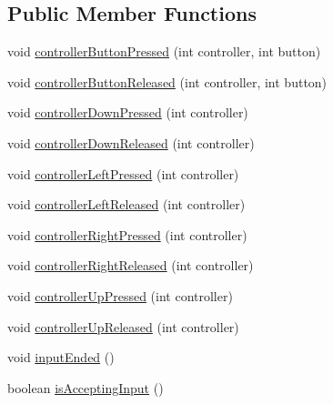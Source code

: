 \subsection*{Public Member Functions}
\begin{DoxyCompactItemize}
\item 
void \mbox{\hyperlink{classorg_1_1newdawn_1_1slick_1_1util_1_1_input_adapter_ad51a716fce13f062b7bef542c2d7641a}{controller\+Button\+Pressed}} (int controller, int button)
\item 
void \mbox{\hyperlink{classorg_1_1newdawn_1_1slick_1_1util_1_1_input_adapter_ab67126cbafdf4803d88270e945553019}{controller\+Button\+Released}} (int controller, int button)
\item 
void \mbox{\hyperlink{classorg_1_1newdawn_1_1slick_1_1util_1_1_input_adapter_af48b82447762dff2bc4b171d51468f1a}{controller\+Down\+Pressed}} (int controller)
\item 
void \mbox{\hyperlink{classorg_1_1newdawn_1_1slick_1_1util_1_1_input_adapter_a6cb307438dc81cba0ec7a9f6b4dbc887}{controller\+Down\+Released}} (int controller)
\item 
void \mbox{\hyperlink{classorg_1_1newdawn_1_1slick_1_1util_1_1_input_adapter_ad588e2783005ae0ff252efbc282688cb}{controller\+Left\+Pressed}} (int controller)
\item 
void \mbox{\hyperlink{classorg_1_1newdawn_1_1slick_1_1util_1_1_input_adapter_af1419aca62539a39f52be90f64e778e3}{controller\+Left\+Released}} (int controller)
\item 
void \mbox{\hyperlink{classorg_1_1newdawn_1_1slick_1_1util_1_1_input_adapter_a558dd87511a7ab61be9d895476e91444}{controller\+Right\+Pressed}} (int controller)
\item 
void \mbox{\hyperlink{classorg_1_1newdawn_1_1slick_1_1util_1_1_input_adapter_ae2c91a34637c5d9af99d2098878b367e}{controller\+Right\+Released}} (int controller)
\item 
void \mbox{\hyperlink{classorg_1_1newdawn_1_1slick_1_1util_1_1_input_adapter_ae4728619a49e096201282b048c6b11df}{controller\+Up\+Pressed}} (int controller)
\item 
void \mbox{\hyperlink{classorg_1_1newdawn_1_1slick_1_1util_1_1_input_adapter_a78fed236d44ced5cc4fc1b1c093f50fb}{controller\+Up\+Released}} (int controller)
\item 
void \mbox{\hyperlink{classorg_1_1newdawn_1_1slick_1_1util_1_1_input_adapter_a7aeb6742cd50649e17774ccbe2ebc9ea}{input\+Ended}} ()
\item 
boolean \mbox{\hyperlink{classorg_1_1newdawn_1_1slick_1_1util_1_1_input_adapter_a8f20e7fc464c8f8f7a676b041e691765}{is\+Accepting\+Input}} ()

\end{DoxyCompactItemize}
